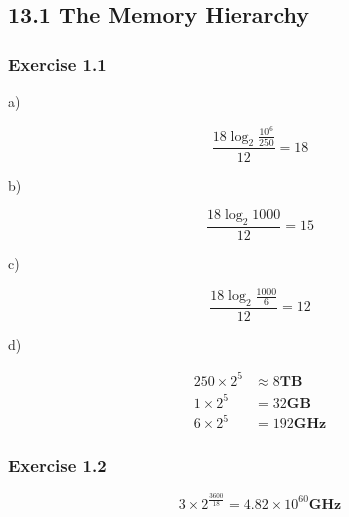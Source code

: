 \documentclass[../../main.tex]{subfiles}
\begin{document}
\subsection*{13.1 The Memory Hierarchy}

\subsubsection*{Exercise 1.1}

a)

$$
\frac{18 \log_{2}\frac{10^6}{250}}{12} = 18
$$

b)

$$
\frac{18 \log_{2}1000}{12} = 15
$$

c)

$$
\frac{18 \log_{2}\frac{1000}{6}}{12} = 12
$$

d)

\begin{align*}
  250 \times 2^5 &\approx 8 \mathbf{TB} \\
  1 \times 2^5 &= 32 \mathbf{GB} \\
  6 \times 2^5 &= 192 \mathbf{GHz}
\end{align*}

\subsubsection*{Exercise 1.2}

$$
3 \times 2^ {\frac{3600}{18}} = 4.82 \times 10^{60} \mathbf{GHz}
$$
\end{document}
